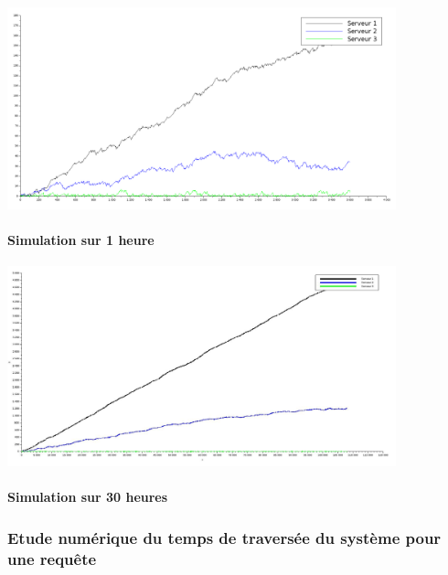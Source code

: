 \documentclass{article}
\begin{document}
\begin{center}
	\includegraphics[width=425px]{img/circul1h.png}
\end{center}
\paragraph{Simulation sur 1 heure}

\begin{center}
	\includegraphics[width=425px]{img/circul30h.jpg}
\end{center}
\paragraph{Simulation sur 30 heures}

\subsubsection{Etude numérique du temps de traversée du système pour une requête}
\end{document}
